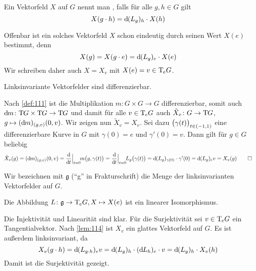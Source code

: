 \begin{definition}[{name=[linksinvariantes Vektorfeld]}]
	Ein Vektorfeld $X$ auf $G$ nennt man , falls für alle $g,h \in G$ gilt
	\[
		X(g \cdot h) = \mathd(L_g)_h \cdot X(h)
	\]
\end{definition}

Offenbar ist ein solches Vektorfeld $X$ schon eindeutig durch seinen Wert $X(e)$ bestimmt, denn 
\[
	X(g) = X(g \cdot e) = \mathd(L_g)_e \cdot X(e)
\]
Wir schreiben daher auch $X=X_v$ mit $X(e)=v \in \Tmap_e G$.

\begin{lemma}[label=lem:114,{name=[Linksinvariante Vektorfelder sind differenzierbar]}]
	Linksinvariante Vektorfelder sind differenzierbar.
\end{lemma}
\begin{beweis}
	Nach \autoref{def:111} ist die Multiplikation $m \colon G \times G \to G$ differenzierbar, somit auch $\mathd m \colon \Tmap G \times \Tmap G \to\Tmap G$ und damit für alle $v \in \Tmap_e G$ auch $\tilde{X}_v \colon G \to \Tmap G$, $g \mapsto (\mathd m)_{(g,e)}(0,v)$.
	Wir zeigen nun $\tilde{X}_v=X_v$.
	Sei dazu $\enbrace[\big]{\gamma(t)}_{t \in (-1,1)}$ eine differenzierbare Kurve in $G$ mit $\gamma(0)=e$ und $\gamma'(0)=v$.
	Dann gilt für $g \in G$ beliebig
	\[
		\tilde{X}_v(g)=(\mathd m)_{(g,e)}(0,v) = \diffd{}{t}\Big|_{t=0} \! m \enbrace[\big]{g,\gamma(t)} = \diffd{}{t}\Big|_{t=0}\! L_g\enbrace[\big]{\gamma(t)} = \mathd(L_g)_{\gamma(0)} \cdot \gamma'(0)
		 =\mathd(L_g)_e v = X_v(g) \qedhere
	\]
\end{beweis}

Wir bezeichnen mit $\mathfrak{g}$ (\enquote{g} in Frakturschrift) die Menge der linksinvarianten Vektorfelder auf $G$.

\begin{korollar}[{name=[{Isomorphismus linkinv. Vektorfelder und Tangentialraum an $e$}]}]
	Die Abbildung $L \colon \mathfrak{g} \to \Tmap_e G, X \mapsto X(e)$ ist ein linearer Isomorphismus.
\end{korollar}
\begin{beweis}
	Die Injektivität und Linearität sind klar.
	Für die Surjektivität sei $v \in \Tmap_e G$ ein Tangentialvektor.
	Nach \autoref{lem:114} ist $X_v$ ein glattes Vektorfeld auf $G$. 
	Es ist außerdem linksinvariant, da
	\[
		X_v(g \cdot h) = \mathd(L_{g \cdot h})_e v = \mathd(L_g)_h \cdot (\mathd L_h)_e \cdot v = \mathd (L_g)_h \cdot X_v(h)
	\]
	Damit ist die Surjektivität gezeigt.
\end{beweis}


